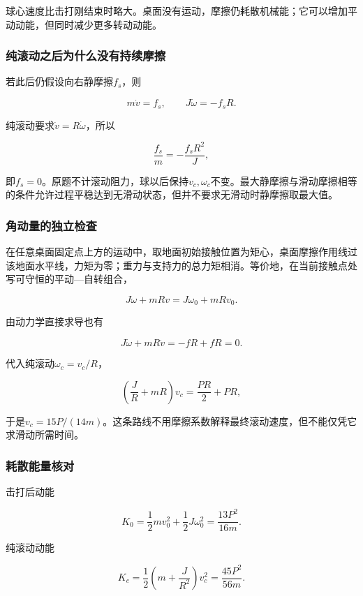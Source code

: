 \documentclass[12pt,a4paper,fontset=fandol]{ctexart}
\begin{document}
球心速度比击打刚结束时略大。桌面没有运动，摩擦仍耗散机械能；它可以增加平动动能，但同时减少更多转动动能。

\subsubsection{纯滚动之后为什么没有持续摩擦}\label{ux7eafux6edaux52a8ux4e4bux540eux4e3aux4ec0ux4e48ux6ca1ux6709ux6301ux7eedux6469ux64e6}

若此后仍假设向右静摩擦\(f_s\)，则

\[
m\dot v=f_s,\qquad J\dot\omega=-f_sR.
\]

纯滚动要求\(\dot v=R\dot\omega\)，所以

\[
\frac{f_s}{m}=-\frac{f_sR^2}{J},
\]

即\(f_s=0\)。原题不计滚动阻力，球以后保持\(v_c,\omega_c\)不变。最大静摩擦与滑动摩擦相等的条件允许过程平稳达到无滑动状态，但并不要求无滑动时静摩擦取最大值。

\subsubsection{角动量的独立检查}\label{ux89d2ux52a8ux91cfux7684ux72ecux7acbux68c0ux67e5}

在任意桌面固定点上方的运动中，取地面初始接触位置为矩心，桌面摩擦作用线过该地面水平线，力矩为零；重力与支持力的总力矩相消。等价地，在当前接触点处写可守恒的平动---自转组合，

\[
J\omega+mRv
=J\omega_0+mRv_0.
\]

由动力学直接求导也有

\[
J\dot\omega+mR\dot v
=-fR+fR=0.
\]

代入纯滚动\(\omega_c=v_c/R\)，

\[
\left(\frac JR+mR\right)v_c
=\frac{PR}{2}+PR,
\]

于是\(v_c=15P/(14m)\)。这条路线不用摩擦系数解释最终滚动速度，但不能仅凭它求滑动所需时间。

\subsubsection{耗散能量核对}\label{ux8017ux6563ux80fdux91cfux6838ux5bf9}

击打后动能

\[
K_0=\frac12mv_0^2+\frac12J\omega_0^2
=\frac{13P^2}{16m}.
\]

纯滚动动能

\[
K_c=\frac12\left(m+\frac J{R^2}\right)v_c^2
=\frac{45P^2}{56m}.
\]
\end{document}
